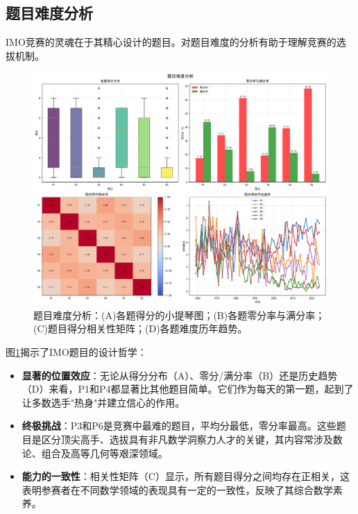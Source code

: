 \documentclass[12pt,a4paper]{article}
\begin{document}
\subsection{题目难度分析}
IMO竞赛的灵魂在于其精心设计的题目\cite{andreescu2006mathematical}。对题目难度的分析有助于理解竞赛的选拔机制。

\begin{figure}[H]
    \centering
    \includegraphics[width=\textwidth]{problem_difficulty.png}
    \caption{题目难度分析：(A)各题得分的小提琴图；(B)各题零分率与满分率；(C)题目得分相关性矩阵；(D)各题难度历年趋势。}
    \label{fig:problem_difficulty}
\end{figure}

图\ref{fig:problem_difficulty}揭示了IMO题目的设计哲学：
\begin{itemize}
    \item \textbf{显著的位置效应}：无论从得分分布（A）、零分/满分率（B）还是历史趋势（D）来看，P1和P4都显著比其他题目简单。它们作为每天的第一题，起到了让多数选手"热身"并建立信心的作用。
    \item \textbf{终极挑战}：P3和P6是竞赛中最难的题目，平均分最低，零分率最高。这些题目是区分顶尖高手、选拔具有非凡数学洞察力人才的关键，其内容常涉及数论、组合及高等几何等艰深领域\cite{rosen2019handbook,coxeter1961introduction}。
    \item \textbf{能力的一致性}：相关性矩阵（C）显示，所有题目得分之间均存在正相关，这表明参赛者在不同数学领域的表现具有一定的一致性，反映了其综合数学素养。
\end{itemize}
\end{document}
